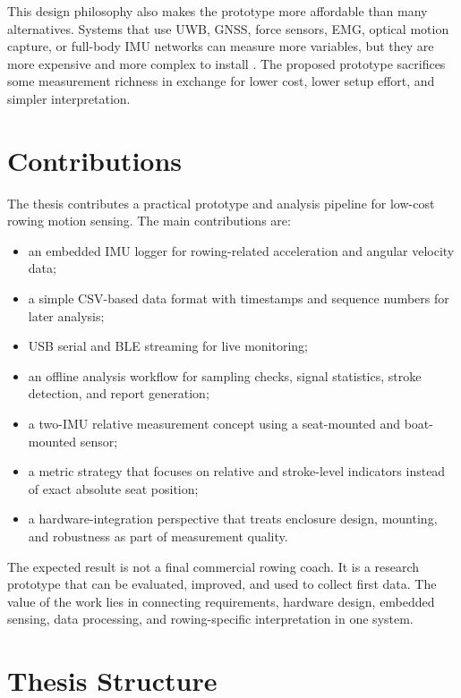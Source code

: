 This design philosophy also makes the prototype more affordable than many alternatives. Systems that use UWB, GNSS, force sensors, EMG, optical motion capture, or full-body IMU networks can measure more variables, but they are more expensive and more complex to install \cite{hohmuth_wireless_2023,rodriguez_mendoza_wearable_2024,ruffaldi_sensor_2015}. The proposed prototype sacrifices some measurement richness in exchange for lower cost, lower setup effort, and simpler interpretation.

\section{Contributions}

The thesis contributes a practical prototype and analysis pipeline for low-cost rowing motion sensing. The main contributions are:

\begin{itemize}
  \item an embedded IMU logger for rowing-related acceleration and angular velocity data;
  \item a simple CSV-based data format with timestamps and sequence numbers for later analysis;
  \item USB serial and BLE streaming for live monitoring;
  \item an offline analysis workflow for sampling checks, signal statistics, stroke detection, and report generation;
  \item a two-IMU relative measurement concept using a seat-mounted and boat-mounted sensor;
  \item a metric strategy that focuses on relative and stroke-level indicators instead of exact absolute seat position;
  \item a hardware-integration perspective that treats enclosure design, mounting, and robustness as part of measurement quality.
\end{itemize}

The expected result is not a final commercial rowing coach. It is a research prototype that can be evaluated, improved, and used to collect first data. The value of the work lies in connecting requirements, hardware design, embedded sensing, data processing, and rowing-specific interpretation in one system.

\section{Thesis Structure}

